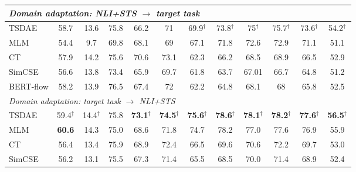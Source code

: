 \documentclass[11pt]{article}
\begin{document}
\begin{table*}[t]
{\begin{tabular}{|l|c|c|ccc|ccccc|c|}
\hline
\multicolumn{12}{|l|}{ \textit{Domain adaptation: NLI+STS $\to$ target task} }  \\
\hline
TSDAE  & 58.7 & 13.6 & 75.8 & 66.2 & 71 & {69.9}$^\dagger$ & {73.8}$^\dagger$ & {75}$^\dagger$ & {75.7}$^\dagger$ & {73.6}$^\dagger$ & {54.2}$^\dagger$ \\
MLM & 54.4 & 9.7 & 69.8 & 68.1 & 69 & 67.1 & 71.8 & 72.6 & 72.9 & 71.1 & 51.1 \\
CT & 57.9 & 14.2 & 75.6 & 70.6 & 73.1 & 62.3 & 66.2 & 68.5 & 68.9 & 66.5 & 52.9 \\
SimCSE & 56.6 & 13.8 & 73.4 & 65.9 & 69.7 & 61.8 & 63.7 & 67.01 & 66.7 & 64.8 & 51.2 \\
BERT-flow & 58.2 & 13.9 & 76.5 & 67.4 & 72 & 62.2 & 64.8 & 68.1 & 68 & 65.8 & 52.5 \\

\hline
\multicolumn{12}{|l|}{ \textit{Domain adaptation: target task $\to$ NLI+STS} } \\
\hline
TSDAE & {59.4}$^\dagger$ & {14.4}$^\dagger$ & 75.8 & \textbf{73.1}$^\dagger$ & \textbf{74.5}$^\dagger$ & \textbf{75.6}$^\dagger$ & \textbf{78.6}$^\dagger$ & \textbf{78.1}$^\dagger$ & \textbf{78.2}$^\dagger$ & \textbf{77.6}$^\dagger$ & \textbf{56.5}$^\dagger$ \\
MLM & \textbf{60.6} & 14.3 & 75.0 & 68.6 & 71.8 & 74.7 & 78.2 & 77.0 & 77.6 & 76.9 & 55.9 \\
CT & 56.4 & 13.4 & 75.9 & 68.9 & 72.4 & 66.5 & 69.6 & 70.6 & 72.2 & 69.7 & 53.0 \\
SimCSE & 56.2 & 13.1 & 75.5 & 67.3 & 71.4 & 65.5 & 68.5 & 70.0 & 71.4 & 68.9 & 52.4 \\



\end{tabular}}
\end{table*}
\end{document}
